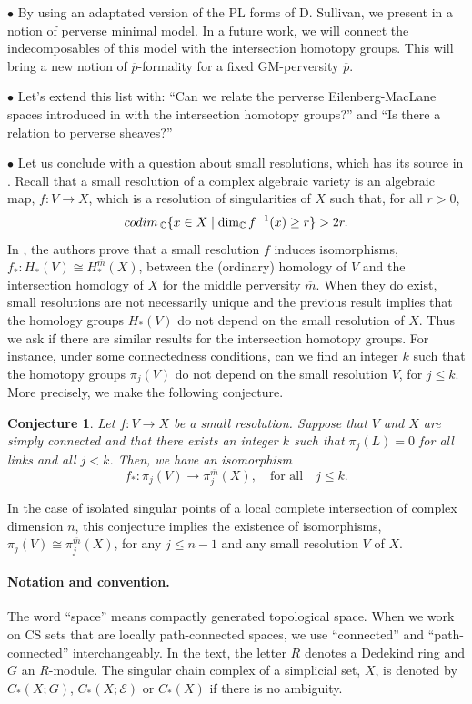\documentclass[a4paper,10pt,english,reqno]{amsart}
\theoremstyle{plain}
\newtheorem{conjecture}{Conjecture}
\theoremstyle{definition}
\theoremstyle{remark}
\numberwithin{equation}{section}
\def\ov{\overline}
\def\cE{{\mathcal E}}
\def\C{\mathbb{C}}
\def\codim{{\rm codim\,}}
\renewcommand\1{\hbox{\ding{192}}}
\renewcommand\2{\hbox{\ding{193}}}
\newcommand\3{\hbox{\ding{194}}}
\newcommand\4{\hbox{\ding{195}}}
\begin{document}
\smallskip $\bullet$
By using an adaptated version of the PL forms of D. Sullivan, we present in  \cite{CST1} 
 a notion of perverse minimal model. In a future work, we will connect
the indecomposables of this model with the intersection homotopy groups.
This will bring a new notion of $\ov{p}$-formality for a fixed GM-perversity $\ov{p}$.

\smallskip $\bullet$
%
%
Let's extend this list with: 
%
%
``Can we relate the perverse Eilenberg-MacLane spaces introduced in \cite{CT1} with the
intersection homotopy groups?''
%
%
and ``Is there a relation to perverse sheaves?''
%

\smallskip $\bullet$
Let us conclude with a question about small resolutions, which has its source in \cite[Section 6.2]{GM2}.
Recall that a small resolution of a complex algebraic variety is an algebraic map,
$f\colon V\to X$,
which is a resolution of singularities of $X$ such that, for all $r>0$, 
$$\codim_{\C}\{x\in X\mid \dim_{\C }f^{-1}(x)\geq r\}>2r.$$
In \cite{GM2}, the authors prove that a small resolution $f$ induces  isomorphisms,
$f_{*}\colon H_{*}(V)\cong H_{*}^{\ov{m}}(X)$,
between the (ordinary) homology of $V$ and the intersection homology of $X$ for the middle perversity $\ov{m}$.
When they do exist,  small resolutions are not necessarily unique and the previous result implies that the homology 
groups $H_{*}(V)$ do not depend on the small resolution of $X$. Thus we ask if there are similar results
for the intersection homotopy groups. 
For instance, under some connectedness conditions, can we find an integer $k$ such that
the homotopy groups $\pi_{j}(V)$ do not depend on the small resolution $V$, for $j\leq k$. 
More precisely, we make the following conjecture.
\begin{conjecture}
Let $f\colon V\to X$ be a small resolution. Suppose that $V$ and $X$ are simply connected and 
that there exists an integer $k$ such that $\pi_{j}(L)=0$ for all links and all $j<k$. Then, we have an isomorphism
$$f_{*}\colon \pi_{j}(V)\to \pi_{j}^{\ov{m}}(X), \quad\text{for all} \quad j\leq k.$$
\end{conjecture}
\noindent
%
%
In the case of isolated singular points of a local complete intersection of complex dimension $n$, this 
 conjecture implies the existence of isomorphisms, $\pi_{j}(V)\cong \pi_{j}^{\ov{m}}(X)$, 
 for any $j\leq n-1$ and any small resolution
$V$ of $X$.
%
%

\medskip
\paragraph{{\bf Notation and convention.}}
The word ``space'' means compactly generated topological space.
When we work on CS sets that are locally path-connected spaces, we use ``connected''  and  ``path-connected'' interchangeably.
%
In the text, the letter $R$ denotes a Dedekind ring and $G$ an $R$-module. 
The singular chain complex of a  simplicial set, $X$,  is denoted by
$C_*(X;G)$, $C_{*}(X;\cE)$ or $C_{*}(X)$ if there is no ambiguity.
\end{document}
